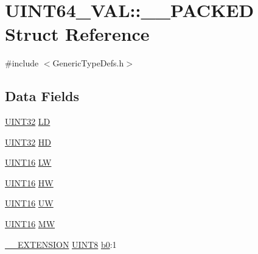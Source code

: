 \hypertarget{struct_u_i_n_t64___v_a_l_1_1_____p_a_c_k_e_d}{}\section{U\+I\+N\+T64\+\_\+\+V\+A\+L\+:\+:\+\_\+\+\_\+\+P\+A\+C\+K\+E\+D Struct Reference}
\label{struct_u_i_n_t64___v_a_l_1_1_____p_a_c_k_e_d}


{\ttfamily \#include $<$Generic\+Type\+Defs.\+h$>$}

\subsection*{Data Fields}
\begin{DoxyCompactItemize}
\item 
\hyperlink{_generic_type_defs_8h_a1720f33f59b583f0c2ed071815623a86}{U\+I\+N\+T32} \hyperlink{struct_u_i_n_t64___v_a_l_1_1_____p_a_c_k_e_d_ac6e00c6c9f170ee0d64686678c3556be}{L\+D}
\item 
\hyperlink{_generic_type_defs_8h_a1720f33f59b583f0c2ed071815623a86}{U\+I\+N\+T32} \hyperlink{struct_u_i_n_t64___v_a_l_1_1_____p_a_c_k_e_d_aa81f9f4eaa34f17c547512f32819f8ad}{H\+D}
\item 
\hyperlink{_generic_type_defs_8h_acfa284fa8026c4aace2728f7f15d6c13}{U\+I\+N\+T16} \hyperlink{struct_u_i_n_t64___v_a_l_1_1_____p_a_c_k_e_d_a477e8bb9e7a481eaa53cdd13a8c16f9d}{L\+W}
\item 
\hyperlink{_generic_type_defs_8h_acfa284fa8026c4aace2728f7f15d6c13}{U\+I\+N\+T16} \hyperlink{struct_u_i_n_t64___v_a_l_1_1_____p_a_c_k_e_d_a6fb036060d459ee2d59cc749ebbed0df}{H\+W}
\item 
\hyperlink{_generic_type_defs_8h_acfa284fa8026c4aace2728f7f15d6c13}{U\+I\+N\+T16} \hyperlink{struct_u_i_n_t64___v_a_l_1_1_____p_a_c_k_e_d_af5ef418064766b8266ce97005574f3be}{U\+W}
\item 
\hyperlink{_generic_type_defs_8h_acfa284fa8026c4aace2728f7f15d6c13}{U\+I\+N\+T16} \hyperlink{struct_u_i_n_t64___v_a_l_1_1_____p_a_c_k_e_d_aea90d3e268c422d09bf5c384083bb57a}{M\+W}
\item 
\hyperlink{_generic_type_defs_8h_a6f634b0fdcc4febac630fc28e2685ddb}{\+\_\+\+\_\+\+E\+X\+T\+E\+N\+S\+I\+O\+N} \hyperlink{_generic_type_defs_8h_ab27e9918b538ce9d8ca692479b375b6a}{U\+I\+N\+T8} \hyperlink{struct_u_i_n_t64___v_a_l_1_1_____p_a_c_k_e_d_a4074b3ee420d7782dce819fb031c29a2}{b0}\+:1
\item 

\end{DoxyCompactItemize}
